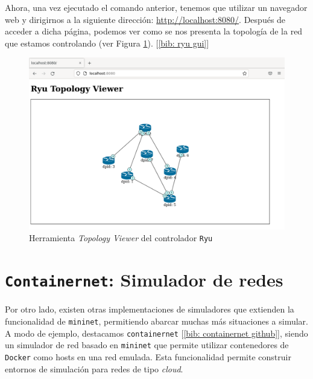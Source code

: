 \documentclass[a4paper, oneside, 12pt]{book}
\begin{document}
	\pagebreak

	\noindent Ahora, una vez ejecutado el comando anterior, tenemos que utilizar un navegador web y dirigirnos a la siguiente dirección: \url{http://localhost:8080/}. Después de acceder a dicha página, podemos ver como se nos presenta la topología de la red que estamos controlando (ver Figura \ref{img: mn ryu 3}). [\ref{bib: ryu gui}]
	
	\vspace{10px}
	
	\begin{figure}[h!]
		\begin{center}
			\includegraphics[width=1\textwidth]{img/mn_ryu_3.png}
			\caption{Herramienta \textit{Topology Viewer} del controlador \texttt{Ryu}}
			\label{img: mn ryu 3}	
		\end{center}
	\end{figure}
	
	\pagebreak
	
	\section{\texttt{Containernet}: Simulador de redes}
	
	\noindent Por otro lado, existen otras implementaciones de simuladores que extienden la funcionalidad de \texttt{mininet}, permitiendo abarcar muchas más situaciones a simular. A modo de ejemplo, destacamos \texttt{containernet} [\ref{bib: containernet github}], siendo un simulador de red basado en \texttt{mininet} que permite utilizar contenedores de \texttt{Docker} como hosts en una red emulada. Esta funcionalidad permite construir entornos de simulación para redes de tipo \textit{cloud}. \\
	
\end{document}
